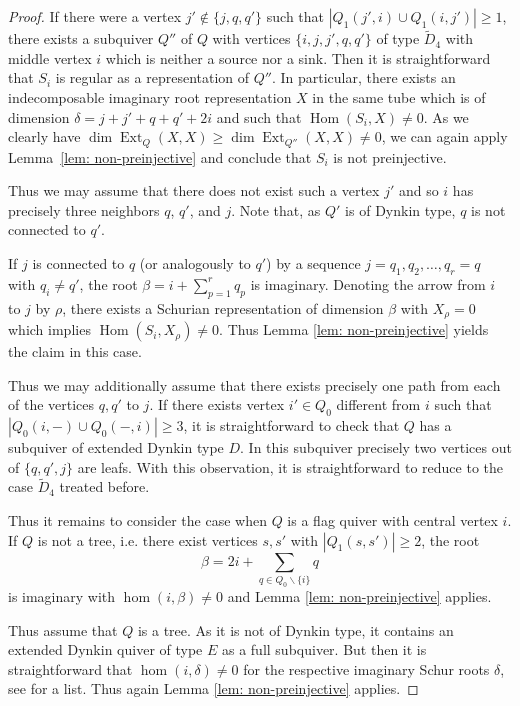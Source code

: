 \documentclass{amsart}
\numberwithin{equation}{section}
\newcommand{\Ext}{\operatorname{Ext}}
\newcommand{\Hom}{\operatorname{Hom}}
\begin{document}
\begin{proof}
  If there were a vertex $j'\notin \{j,q,q'\}$ such that $|Q_1(j',i)\cup Q_1(i,j')|\geq 1$, there exists a subquiver $Q''$ of $Q$ with vertices $\{i,j,j',q,q'\}$ of type $\tilde D_4$ with middle vertex $i$ which is neither a source nor a sink.
  Then it is straightforward that $S_i$ is regular as a representation of $Q''$.
  In particular, there exists an indecomposable imaginary root representation $X$ in the same tube which is of dimension $\delta=j+j'+q+q'+2i$ and such that $\Hom(S_i,X)\neq 0$.
  As we clearly have $\dim\Ext_Q(X,X)\geq \dim\Ext_{Q''}(X,X)\neq 0$, we can again apply Lemma~\ref{lem: non-preinjective} and conclude that $S_i$ is not preinjective.

  Thus we may assume that there does not exist such a vertex $j'$ and so $i$ has precisely three neighbors $q$, $q'$, and $j$. Note that, as $Q'$ is of Dynkin type, $q$ is not connected to $q'$.
	
	  If $j$ is connected to $q$ (or analogously to $q'$) by a sequence $j=q_1,q_2,\ldots,q_r=q$ with $q_i\neq q'$, the root $\beta=i+\sum_{p=1}^rq_p$ is imaginary. Denoting the arrow from $i$ to $j$ by $\rho$, there exists a Schurian representation of dimension $\beta$ with $X_\rho=0$ which implies $\Hom(S_i,X_\rho)\neq 0$. 
  Thus Lemma \ref{lem: non-preinjective} yields the claim in this case.  


  Thus we may additionally assume that there exists precisely one path from each of the vertices $q,q'$ to $j$. If there exists vertex $i'\in Q_0$ different from $i$ such that $|Q_0(i,-)\cup Q_0(-,i)|\geq 3$, it is straightforward to check that $Q$ has a subquiver of extended Dynkin type $D$. In this subquiver precisely two vertices out of $\{q,q',j\}$ are leafs. With this observation, it is straightforward to reduce to the case $\tilde D_4$ treated before.

  Thus it remains to consider the case when $Q$ is a flag quiver with central vertex $i$.
  If $Q$ is not a tree, i.e. there exist vertices $s,s'$ with $|Q_1(s,s')|\geq 2$, the root 
  $$\beta=2i+\sum_{q\in Q_0\backslash\{i\}}q$$
  is imaginary with $\hom(i,\beta)\neq 0$ and Lemma \ref{lem: non-preinjective} applies.
  
	Thus assume that $Q$ is a tree. As it is not of Dynkin type, it contains an extended Dynkin quiver of type $E$ as a full subquiver. But then it is straightforward that $\hom(i,\delta)\neq 0$ for the respective imaginary Schur roots $\delta$, see \cite[Section 4]{CB} for a list. Thus again Lemma \ref{lem: non-preinjective} applies.
	

\end{proof}
\end{document}
